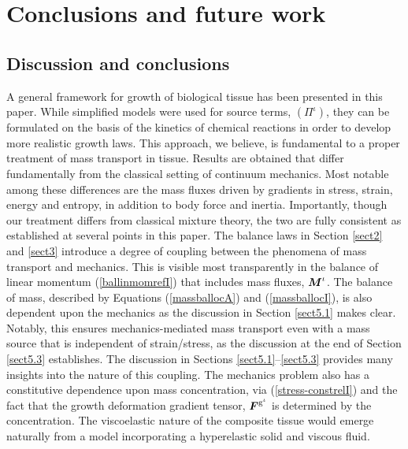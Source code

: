 \chapter{Conclusions and future work}
\label{conclusions}


\section{Discussion and conclusions}
\label{discussion}

A general framework for growth of biological tissue has been
presented in this paper. While simplified models were used for
source terms, $(\Pi^\iota)$, they can be formulated on the basis
of the kinetics of chemical reactions in order to develop more
realistic growth laws. This approach, we believe, is fundamental
to a proper treatment of mass transport in tissue. Results are
obtained that differ fundamentally from the classical setting of
continuum mechanics. Most notable among these differences are the
mass fluxes driven by gradients in stress, strain, energy and
entropy, in addition to body force and inertia. Importantly,
though our treatment differs from classical mixture theory, the
two are fully consistent as established at several points in this
paper. The balance laws in Section \ref{sect2} and \ref{sect3}
introduce a degree of coupling between the phenomena of mass
transport and mechanics. This is visible most transparently in the
balance of linear momentum (\ref{ballinmomrefI}) that includes
mass fluxes, $\mbox{\boldmath$ M$}^\iota$. The balance of mass, described by
Equations (\ref{massballocA}) and (\ref{massballocI}), is also
dependent upon the mechanics as the discussion in Section
\ref{sect5.1} makes clear. Notably, this ensures
mechanics-mediated mass transport even with a mass source that is
independent of strain/stress, as the discussion at the end of
Section \ref{sect5.3} establishes. The discussion in Sections
\ref{sect5.1}--\ref{sect5.3} provides many insights into the
nature of this coupling. The mechanics problem also has a
constitutive dependence upon mass concentration, via
(\ref{stress-constrelI}) and the fact that the growth deformation
gradient tensor, $\mbox{\boldmath$ F$}^{\mathrm{g}^\iota}$ is determined by the
concentration. The viscoelastic nature of the composite tissue
would emerge naturally from a model incorporating a hyperelastic
solid and viscous fluid.

